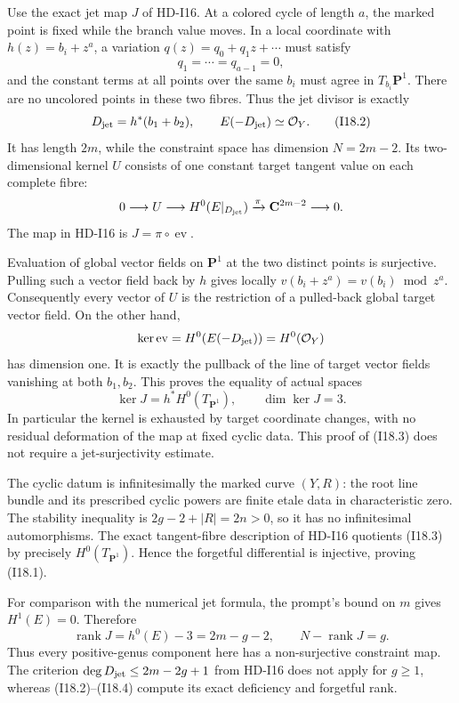 Use the exact jet map $J$ of HD-I16. At a colored cycle of length
$a$, the marked point is fixed while the branch value moves.
In a local coordinate with $h(z)=b_i+z^a$, a variation
$q(z)=q_0+q_1z+\cdots$ must satisfy
\[
 q_1=\cdots=q_{a-1}=0,
\]
and the constant terms at all points over the same $b_i$ must
agree in $T_{b_i}\mathbf P^1$. There are no uncolored points in
these two fibres. Thus the jet divisor is exactly
\begin{equation}
 D_{\rm jet}=h^*(b_1+b_2),\qquad
 E(-D_{\rm jet})\simeq\mathcal O_Y.                  \tag{I18.2}
\end{equation}
It has length $2m$, while the constraint space has dimension
$N=2m-2$. Its two-dimensional kernel $U$ consists of one
constant target tangent value on each complete fibre:
\[
 0\longrightarrow U\longrightarrow H^0(E|_{D_{\rm jet}})
                  \xrightarrow{\pi}\mathbf C^{2m-2}
                  \longrightarrow0.
\]
The map in HD-I16 is $J=\pi\circ\operatorname{ev}$.

Evaluation of global vector fields on $\mathbf P^1$ at the two
distinct points is surjective. Pulling such a vector field back
by $h$ gives locally $v(b_i+z^a)=v(b_i)\bmod z^a$.
Consequently every vector of $U$ is the restriction of a
pulled-back global target vector field. On the other hand,
\[
 \ker\operatorname{ev}
   =H^0(E(-D_{\rm jet}))=H^0(\mathcal O_Y)
\]
has dimension one. It is exactly the pullback of the line of
target vector fields vanishing at both $b_1,b_2$. This proves
the equality of actual spaces
\begin{equation}
       \ker J=h^*H^0(T_{\mathbf P^1}),\qquad
                         \dim\ker J=3.              \tag{I18.3}
\end{equation}
In particular the kernel is exhausted by target coordinate
changes, with no residual deformation of the map at fixed
cyclic data. This proof of (I18.3) does not require a
jet-surjectivity estimate.

The cyclic datum is infinitesimally the marked curve $(Y,R)$:
the root line bundle and its prescribed cyclic powers are finite
etale data in characteristic zero. The stability inequality is
$2g-2+|R|=2n>0$, so it has no infinitesimal automorphisms.
The exact tangent-fibre description of HD-I16 quotients (I18.3)
by precisely $H^0(T_{\mathbf P^1})$. Hence the forgetful
differential is injective, proving (I18.1).

For comparison with the numerical jet formula, the prompt's
bound on $m$ gives $H^1(E)=0$. Therefore
\begin{equation}
 \operatorname{rank}J=h^0(E)-3=2m-g-2,
 \qquad N-\operatorname{rank}J=g.                    \tag{I18.4}
\end{equation}
Thus every positive-genus component here has a non-surjective
constraint map. The criterion $\deg D_{\rm jet}\leq2m-2g+1$
from HD-I16 does not apply for $g\geq1$, whereas (I18.2)--(I18.4)
compute its exact deficiency and forgetful rank.

